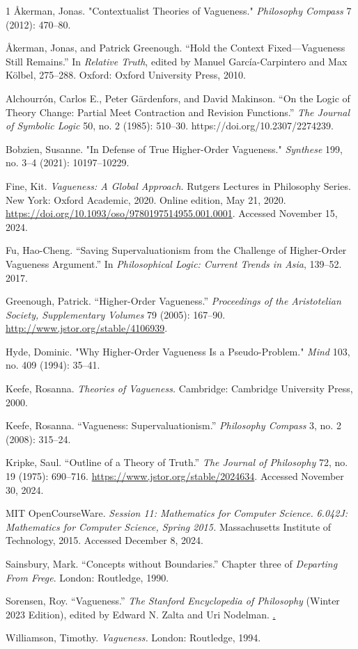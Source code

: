 \begin{hangparas}{\hangingindent}{1}
Åkerman, Jonas. "Contextualist Theories of Vagueness." \emph{Philosophy
Compass} 7 (2012): 470--80.

Åkerman, Jonas, and Patrick Greenough. ``Hold the Context
Fixed---Vagueness Still Remains.'' In \emph{Relative Truth}, edited by
Manuel García-Carpintero and Max Kölbel, 275--288. Oxford: Oxford
University Press, 2010.

Alchourrón, Carlos E., Peter Gärdenfors, and David Makinson. ``On the
Logic of Theory Change: Partial Meet Contraction and Revision
Functions.'' \emph{The Journal of Symbolic Logic} 50, no. 2 (1985):
510--30. https://doi.org/10.2307/2274239.

Bobzien, Susanne. "In Defense of True Higher-Order Vagueness."
\emph{Synthese} 199, no. 3--4 (2021): 10197--10229.

Fine, Kit. \emph{Vagueness: A Global Approach.} Rutgers Lectures in
Philosophy Series. New York: Oxford Academic, 2020. Online edition, May
21, 2020. \url{https://doi.org/10.1093/oso/9780197514955.001.0001}.
Accessed November 15, 2024.

Fu, Hao-Cheng. ``Saving Supervaluationism from the Challenge of
Higher-Order Vagueness Argument.'' In \emph{Philosophical Logic: Current
Trends in Asia}, 139--52. 2017.

Greenough, Patrick. ``Higher-Order Vagueness.'' \emph{Proceedings of the
Aristotelian Society, Supplementary Volumes} 79 (2005): 167--90.
\url{http://www.jstor.org/stable/4106939}.

Hyde, Dominic. "Why Higher-Order Vagueness Is a Pseudo-Problem."
\emph{Mind} 103, no. 409 (1994): 35--41.

Keefe, Rosanna. \emph{Theories of Vagueness.} Cambridge: Cambridge
University Press, 2000.

Keefe, Rosanna. ``Vagueness: Supervaluationism.'' \emph{Philosophy
Compass} 3, no. 2 (2008): 315--24.

Kripke, Saul. ``Outline of a Theory of Truth.'' \emph{The Journal of
Philosophy} 72, no. 19 (1975): 690--716.
\url{https://www.jstor.org/stable/2024634}. Accessed November 30, 2024.

MIT OpenCourseWare. \emph{Session 11: Mathematics for Computer Science.}
\emph{6.042J: Mathematics for Computer Science, Spring 2015.}
Massachusetts Institute of Technology, 2015. Accessed December 8, 2024.

Sainsbury, Mark. ``Concepts without Boundaries.'' Chapter three of
\emph{Departing From Frege}. London: Routledge, 1990.

Sorensen, Roy. ``Vagueness.'' \emph{The Stanford Encyclopedia of
Philosophy} (Winter 2023 Edition), edited by Edward N. Zalta and Uri
Nodelman.
\href{https://plato.stanford.edu/archives/win2023/entries/vagueness/}.

Williamson, Timothy. \emph{Vagueness.} London: Routledge, 1994.
\end{hangparas}
